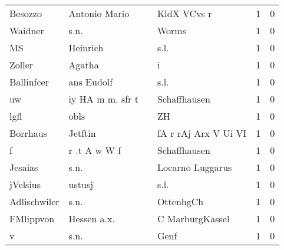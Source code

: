 \begin{tabular}{llllrr}
                  Besozzo &                      Antonio Mario &             &                                 KldX VCvs r &          1 &         0 \\
                  Waidner &                               s.n. &             &                                       Worms &          1 &         0 \\
                       MS &                           Heinrich &             &                                        s.l. &          1 &         0 \\
                   Zoller &                             Agatha &             &                                           i &          1 &         0 \\
               Ballinfcer &                         ans Eudolf &             &                                        s.l. &          1 &         0 \\
                       uw &                   iy HA m m. sfr t &             &                                Schaffhausen &          1 &         0 \\
                     lgfl &                               obls &             &                                          ZH &          1 &         0 \\
                 Borrhaus &                            Jetftin &             &                        fA r rAj Arx V Ui VI &          1 &         0 \\
                        f &                       r .t A w W f &             &                                Schaffhausen &          1 &         0 \\
                  Jesaias &                               s.n. &             &                            Locarno Luggarus &          1 &         0 \\
                 jVelsius &                             ustusj &             &                                        s.l. &          1 &         0 \\
             Adlischwiler &                               s.n. &             &                                   OttenhgCh &          1 &         0 \\
                FMlippvon &                        Hessen a.x. &             &                             C MarburgKassel &          1 &         0 \\
                        v &                               s.n. &             &                                        Genf &          1 &         0 \\

\end{tabular}
